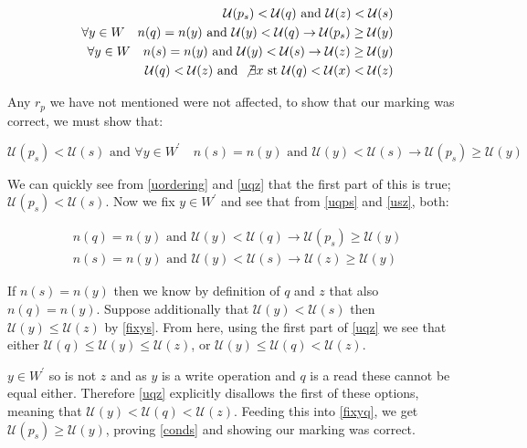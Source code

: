 \documentclass[twoside,a4paper]{report}
\begin{document}
\begin{align}
\mathcal{U}(p_s) < \mathcal{U}(q) \text{ and } \mathcal{U}(z) < \mathcal{U}(s) \label{uordering} \\
\forall y \in W \quad n(q) = n(y) \text{ and } \mathcal{U}(y) < \mathcal{U}(q) \rightarrow \mathcal{U}(p_s) \ge \mathcal{U}(y) \label{uqps} \\
\forall y \in W \quad n(s) = n(y) \text{ and } \mathcal{U}(y) < \mathcal{U}(s) \rightarrow \mathcal{U}(z) \ge \mathcal{U}(y) \label{usz} \\
\mathcal{U}(q) < \mathcal{U}(z) \text{ and } \not \exists x \text{ st } \mathcal{U}(q) < \mathcal{U}(x) < \mathcal{U}(z) \label{uqz}
\end{align}

Any $r_p$ we have not mentioned were not affected, to show that our marking was correct, we must show that:

\begin{equation} \label{conds}
\mathcal{U}(p_s) < \mathcal{U}(s) \text{ and }
\forall y \in W^\prime \quad n(s) = n(y) \text{ and } \mathcal{U}(y) < \mathcal{U}(s) \rightarrow \mathcal{U}(p_s) \ge \mathcal{U}(y)
\end{equation}

We can quickly see from \eqref{uordering} and \eqref{uqz} that the first part of this is true; $\mathcal{U}(p_s) < \mathcal{U}(s)$. Now we fix
$y \in W^\prime$ and see that from \eqref{uqps} and \eqref{usz}, both:

\begin{align}
n(q) = n(y) \text{ and } \mathcal{U}(y) < \mathcal{U}(q) \rightarrow \mathcal{U}(p_s) \ge \mathcal{U}(y) \label{fixyq} \\
n(s) = n(y) \text{ and } \mathcal{U}(y) < \mathcal{U}(s) \rightarrow \mathcal{U}(z) \ge \mathcal{U}(y) \label{fixys}
\end{align}

If $n(s) = n(y)$ then we know by definition of $q$ and $z$ that also $n(q) = n(y)$. Suppose additionally that $\mathcal{U}(y) < \mathcal{U}(s)$ then
$\mathcal{U}(y) \le \mathcal{U}(z)$ by \eqref{fixys}. From here, using the first part of \eqref{uqz} we see that either $\mathcal{U}(q) \le \mathcal{U}(y) \le \mathcal{U}(z)$, or
$\mathcal{U}(y) \le \mathcal{U}(q) < \mathcal{U}(z)$.

$y \in W^\prime$ so is not $z$ and as $y$ is a write operation and $q$ is a read these cannot be equal either. Therefore \eqref{uqz} explicitly disallows
the first of these options, meaning that $\mathcal{U}(y) < \mathcal{U}(q) < \mathcal{U}(z)$. Feeding this into \eqref{fixyq}, we get
$\mathcal{U}(p_s) \ge \mathcal{U}(y)$, proving \eqref{conds} and showing our marking was correct.
\end{document}
